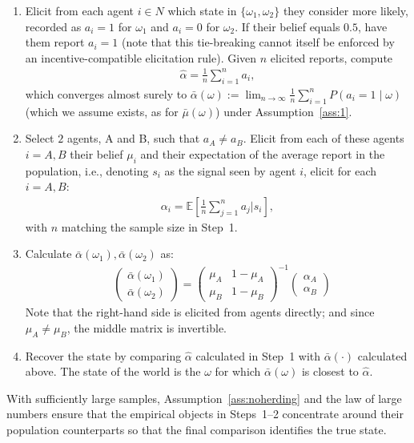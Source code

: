 \documentclass[12pt,reqno]{amsart}
\begin{document}
\begin{framedbox}[htbp]
  \caption{Action-based PMBA, 2 states}\label{proc:ABPMBA}
  \begin{minipage}{0.95\textwidth}
\begin{enumerate}
    \item Elicit from each agent $i \in N$ which state in $\{\omega_1,\omega_2\}$ they consider more likely, recorded as $a_i=1$ for $\omega_1$ and $a_i=0$ for $\omega_2$. If their belief equals $0.5$, have them report $a_i=1$ (note that this tie-breaking cannot itself be enforced by an incentive-compatible elicitation rule). Given $n$ elicited reports, compute
    \begin{align*}
        \hat{\alpha} = \frac1n \sum_{i=1}^n a_i,
    \end{align*}
    which converges almost surely to $\bar{\alpha}(\omega):=\lim_{n\to\infty}\frac1n\sum_{i=1}^nP(a_i=1\mid\omega)$ (which we assume exists, as for $\bar\mu(\omega)$) under Assumption~\ref{ass:1}.
    \item Select $2$ agents, A and B, such that $a_A \neq a_B$. Elicit from each of these agents $i=A,B$ their belief $\mu_i$ and their expectation of the average report in the population, i.e., denoting $s_{i}$ as the signal seen by agent $i$, elicit for each $i =A,B$:
    \begin{align*}
        \alpha_i = \mathbb{E}\left[\frac1n \sum_{j= 1}^n a_j \bigg| s_i\right],
\end{align*}
    with $n$ matching the sample size in Step~1.
    \item Calculate $\bar{\alpha}(\omega_1), \bar{\alpha}(\omega_2)$ as:
\begin{align}
 &  \left( \begin{array}{c} \bar{\alpha}(\omega_1)\\ \bar{\alpha}(\omega_2) \end{array}\right)  = \left( \begin{array}{cc} \mu_{A} & 1-\mu_{A}\\ \mu_{B} & 1-\mu_{B}  \end{array} \right)^{-1} 
    \left( \begin{array}{c} \alpha_A \\ \alpha_{B}
    \end{array}     \right) \label{eqn:mainstep3}
    \end{align}
Note that the right-hand side is elicited from agents directly; and since $\mu_A \neq \mu_B$, the middle matrix is invertible.
\item Recover the state by comparing $\hat{\alpha}$ calculated in Step~1 with $\bar{\alpha}(\cdot)$ calculated above. The state of the world is the $\omega$ for which $\bar{\alpha}(\omega)$ is closest to $\hat{\alpha}$.
\end{enumerate}
With sufficiently large samples, Assumption~\ref{ass:noherding} and the law of large numbers ensure that the empirical objects in Steps~1--2 concentrate around their population counterparts so that the final comparison identifies the true state.
  \end{minipage}
\end{framedbox}
\end{document}
